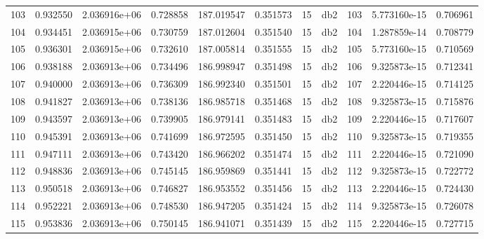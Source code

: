 \begin{tabular}{lrrrrrrlrrr}
103  &    0.932550 &        2.036916e+06 &  0.728858 &              187.019547 &    0.351573 &      15 &          db2 &    103 &   5.773160e-15 &      0.706961 \\
104  &    0.934451 &        2.036915e+06 &  0.730759 &              187.012604 &    0.351540 &      15 &          db2 &    104 &   1.287859e-14 &      0.708779 \\
105  &    0.936301 &        2.036915e+06 &  0.732610 &              187.005814 &    0.351555 &      15 &          db2 &    105 &   5.773160e-15 &      0.710569 \\
106  &    0.938188 &        2.036913e+06 &  0.734496 &              186.998947 &    0.351498 &      15 &          db2 &    106 &   9.325873e-15 &      0.712341 \\
107  &    0.940000 &        2.036913e+06 &  0.736309 &              186.992340 &    0.351501 &      15 &          db2 &    107 &   2.220446e-15 &      0.714125 \\
108  &    0.941827 &        2.036913e+06 &  0.738136 &              186.985718 &    0.351468 &      15 &          db2 &    108 &   9.325873e-15 &      0.715876 \\
109  &    0.943597 &        2.036913e+06 &  0.739905 &              186.979141 &    0.351483 &      15 &          db2 &    109 &   2.220446e-15 &      0.717607 \\
110  &    0.945391 &        2.036913e+06 &  0.741699 &              186.972595 &    0.351450 &      15 &          db2 &    110 &   9.325873e-15 &      0.719355 \\
111  &    0.947111 &        2.036913e+06 &  0.743420 &              186.966202 &    0.351474 &      15 &          db2 &    111 &   2.220446e-15 &      0.721090 \\
112  &    0.948836 &        2.036913e+06 &  0.745145 &              186.959869 &    0.351441 &      15 &          db2 &    112 &   9.325873e-15 &      0.722772 \\
113  &    0.950518 &        2.036913e+06 &  0.746827 &              186.953552 &    0.351456 &      15 &          db2 &    113 &   2.220446e-15 &      0.724430 \\
114  &    0.952221 &        2.036913e+06 &  0.748530 &              186.947205 &    0.351424 &      15 &          db2 &    114 &   9.325873e-15 &      0.726078 \\
115  &    0.953836 &        2.036913e+06 &  0.750145 &              186.941071 &    0.351439 &      15 &          db2 &    115 &   2.220446e-15 &      0.727715 \\

\end{tabular}
